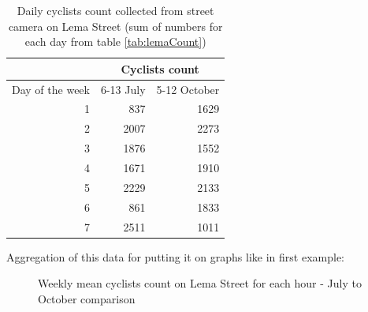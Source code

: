 \begin{table}[h]
    \centering
    \begin{tabular}{|r|r|r|}
\hline
\multicolumn{1}{|l|}{}                & \multicolumn{2}{c|}{Cyclists count}                                \\ \hline
\multicolumn{1}{|l|}{Day of the week} & \multicolumn{1}{l|}{6-13 July} & \multicolumn{1}{l|}{5-12 October} \\ \hline
1                                     & 837                            & 1629                              \\ \hline
2                                     & 2007                           & 2273                              \\ \hline
3                                     & 1876                           & 1552                              \\ \hline
4                                     & 1671                           & 1910                              \\ \hline
5                                     & 2229                           & 2133                              \\ \hline
6                                     & 861                            & 1833                              \\ \hline
7                                     & 2511                           & 1011                              \\ \hline
\end{tabular}
    \caption{Daily cyclists count collected from street camera on Lema Street (sum of numbers for each day from table \ref{tab:lemaCount})}
    \label{tab:lemaSum}
\end{table}
Aggregation of this data for putting it on graphs like in first example:
\begin{figure}[h]
    \centering
    \caption{Weekly mean cyclists count on Lema Street for each hour - July to October comparison}
    \label{fig:lemaCount}
\end{figure}
